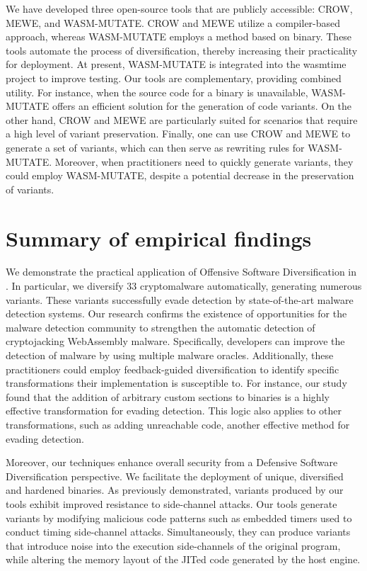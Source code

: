 We have developed three open-source tools that are publicly accessible: CROW, MEWE, and WASM-MUTATE. 
CROW and MEWE utilize a compiler-based approach, whereas WASM-MUTATE employs a method based on binary. 
These tools automate the process of diversification, thereby increasing their practicality for deployment. 
At present, WASM-MUTATE is integrated into the wasmtime project to improve testing. 
Our tools are complementary, providing combined utility. 
For instance, when the source code for a \Wasm binary is unavailable, WASM-MUTATE offers an efficient solution for the generation of code variants. 
On the other hand, CROW and MEWE are particularly suited for scenarios that require a high level of variant preservation.
Finally, one can use CROW and MEWE to generate a set of variants, which can then serve as rewriting rules for WASM-MUTATE. 
Moreover, when practitioners need to quickly generate variants, they could employ WASM-MUTATE, despite a potential decrease in the preservation of variants.


 

\section{Summary of empirical findings}

We demonstrate the practical application of Offensive Software Diversification in \Wasm.
In particular, we diversify 33 \Wasm cryptomalware automatically, generating numerous variants.
These variants successfully evade detection by state-of-the-art malware detection systems.
Our research confirms the existence of opportunities for the malware detection community to strengthen the automatic detection of cryptojacking WebAssembly malware.
Specifically, developers can improve the detection of \Wasm malware by using multiple malware oracles.
Additionally, these practitioners could employ feedback-guided diversification to identify specific transformations their implementation is susceptible to.
For instance, our study found that the addition of arbitrary custom sections to \Wasm binaries is a highly effective transformation for evading detection.
This logic also applies to other transformations, such as adding unreachable code, another effective method for evading detection.

Moreover, our techniques enhance overall security from a Defensive Software Diversification perspective.
We facilitate the deployment of unique, diversified and hardened \Wasm binaries.
As previously demonstrated, \Wasm variants produced by our tools exhibit improved resistance to side-channel attacks.
Our tools generate variants by modifying malicious code patterns such as embedded timers used to conduct timing side-channel attacks.
Simultaneously, they can produce variants that introduce noise into the execution side-channels of the original program, while altering the memory layout of the JITed code generated by the host engine.

